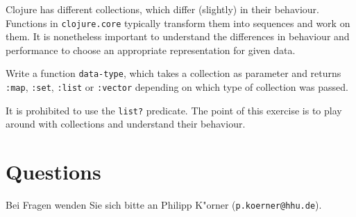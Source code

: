 \documentclass[11pt,a4paper]{article}
\begin{document}
\begin{exercise}
	Clojure has different collections, which differ (slightly) in their behaviour.
	Functions in \verb|clojure.core| typically transform them into sequences and work on them.
	It is nonetheless important to understand the differences in behaviour and performance 
	to choose an appropriate representation for given data.

    Write a function \verb|data-type|, which takes a collection as parameter and returns \verb|:map|, \verb|:set|, \verb|:list| or \verb|:vector|
    depending on which type of collection was passed.

	It is prohibited to use the \verb|list?| predicate.
	The point of this exercise is to play around with collections and understand their behaviour.
\end{exercise}

\section*{Questions}
Bei Fragen wenden Sie sich bitte an Philipp K"orner (\texttt{p.koerner@hhu.de}).
\end{document}
